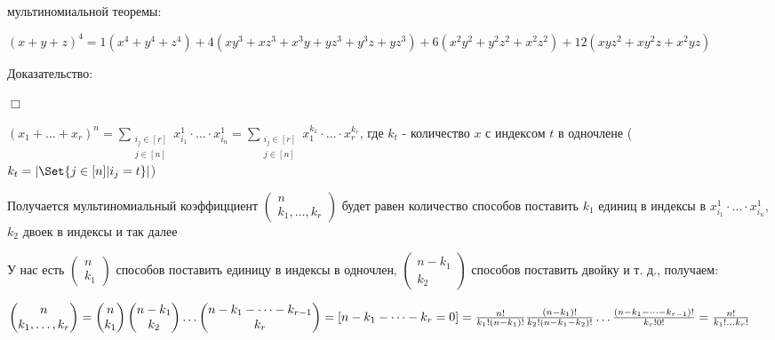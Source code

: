 \documentclass[12pt]{article}
\begin{document}
    \Ex мультиномиальной теоремы:

    $(x + y + z)^4 = 1 (x^4 + y^4 + z^4) + 4 (xy^3 + xz^3 + x^3y + yz^3 + y^3z + yz^3) +
    6(x^2y^2 + y^2z^2 + x^2z^2) + 12 (xyz^2 + xy^2z + x^2yz)$

    Доказательство:

    $\Box$

    $(x_1 + \dots + x_r)^n = \sum_{\substack{i_j \in [r] \\ j \in [n]}} x_{i_1}^1 \cdot \dots \cdot x_{i_n}^1 =
    \sum_{\substack{i_j \in [r] \\ j \in [n]}} x_1^{k_1} \cdot \dots \cdot x_r^{k_r}$, где $k_t$ - количество $x$ с индексом $t$ в одночлене ($k_t = |\Set{j \in [n] | i_j = t}|$)

    Получается мультиномиальный коэффицциент $\begin{pmatrix}
                                                  n \\ k_1, \dots, k_r
    \end{pmatrix}$
    будет равен количество способов поставить $k_1$ единиц в индексы в $x_{i_1}^1 \cdot \dots \cdot x_{i_n}^1$, $k_2$ двоек в индексы и так далее

    У нас есть $\begin{pmatrix}
                    n \\ k_1
    \end{pmatrix}$ способов поставить единицу в индексы в одночлен,
    $\begin{pmatrix}
         n - k_1 \\ k_2
    \end{pmatrix}$ способов поставить двойку и т. д., получаем:

    $\begin{pmatrix}
         n \\ k_1, \dots, k_r
    \end{pmatrix} = \begin{pmatrix}
                        n \\ k_1
    \end{pmatrix} \begin{pmatrix}
                      n - k_1 \\ k_2
    \end{pmatrix} \dots \begin{pmatrix}
                            n - k_1 - \dots - k_{r - 1} \\ k_r
    \end{pmatrix} = [n - k_1 - \dots - k_r = 0] = \\
    \frac{n!}{k_1! (n - k_1)!} \frac{(n - k_1)!}{k_2! (n - k_1 - k_2)!} \dots \frac{(n - k_1 - \dots - k_{r - 1})!}{k_r! 0!} = \frac{n!}{k_1! \dots k_r!}$
\end{document}

